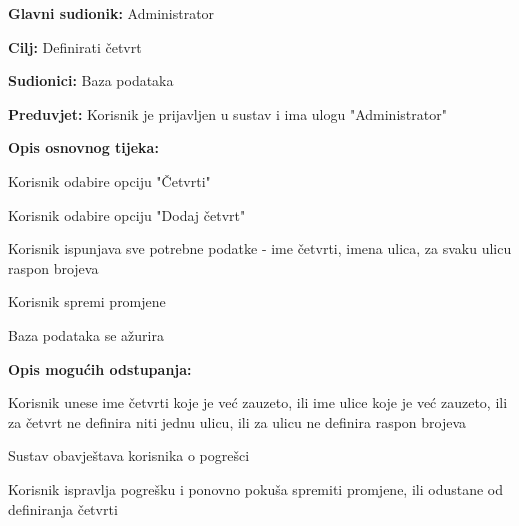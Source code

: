 					\noindent {}
					\begin{packed_item}
	
						\item \textbf{Glavni sudionik: }Administrator
						\item  \textbf{Cilj:} Definirati četvrt
						\item  \textbf{Sudionici:} Baza podataka
						\item  \textbf{Preduvjet:} Korisnik je prijavljen u sustav i ima ulogu "Administrator"
						\item  \textbf{Opis osnovnog tijeka:}
						
						\item[] \begin{packed_enum}
	
							\item Korisnik odabire opciju "Četvrti"
							\item Korisnik odabire opciju "Dodaj četvrt"
							\item Korisnik ispunjava sve potrebne podatke - ime četvrti, imena ulica, za svaku ulicu raspon brojeva
							\item Korisnik spremi promjene
							\item Baza podataka se ažurira
						\end{packed_enum}
						
						\item  \textbf{Opis mogućih odstupanja:}
						
						\item[] \begin{packed_item}
	
							\item[3.a] Korisnik unese ime četvrti koje je već zauzeto, ili ime ulice koje je već zauzeto, ili za četvrt ne definira niti jednu ulicu, ili za ulicu ne definira raspon brojeva
							\item[] \begin{packed_enum}
								
								\item Sustav obavještava korisnika o pogrešci
								\item Korisnik ispravlja pogrešku i ponovno pokuša spremiti promjene, ili odustane od definiranja četvrti
								
							\end{packed_enum}
							
						\end{packed_item}
					\end{packed_item}
					
